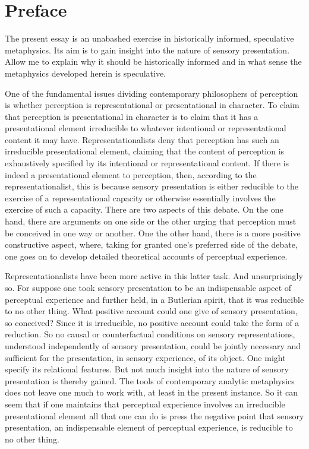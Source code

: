 \chapter*{Preface} %
\label{cha:preface}

The present essay is an unabashed exercise in historically informed, speculative metaphysics. Its aim is to gain insight into the nature of sensory presentation. Allow me to explain why it should be historically informed and in what sense the metaphysics developed herein is speculative.

One of the fundamental issues dividing contemporary philosophers of perception is whether perception is representational or presentational in character. To claim that perception is presentational in character is to claim that it has a presentational element irreducible to whatever intentional or representational content it may have. Representationalists deny that perception has such an irreducible presentational element, claiming that the content of perception is exhaustively specified by its intentional or representational content. If there is indeed a presentational element to perception, then, according to the representationalist, this is because sensory presentation is either reducible to the exercise of a representational capacity or otherwise essentially involves the exercise of such a capacity. There are two aspects of this debate. On the one hand, there are arguments on one side or the other urging that perception must be conceived in one way or another. One the other hand, there is a more positive constructive aspect, where, taking for granted one's preferred side of the debate, one goes on to develop detailed theoretical accounts of perceptual experience. 

Representationalists have been more active in this latter task. And unsurprisingly so. For suppose one took sensory presentation to be an indispensable aspect of perceptual experience and further held, in a Butlerian spirit, that it was reducible to no other thing. What positive account could one give of sensory presentation, so conceived? Since it is irreducible, no positive account could take the form of a reduction. So no causal or counterfactual conditions on sensory representations, understood independently of sensory presentation, could be jointly necessary and sufficient for the presentation, in sensory experience, of its object. One might specify its relational features. But not much insight into the nature of sensory presentation is thereby gained. The tools of contemporary analytic metaphysics does not leave one much to work with, at least in the present instance. So it can seem that if one maintains that perceptual experience involves an irreducible presentational element all that one can do is press the negative point that sensory presentation, an indispensable element of perceptual experience, is reducible to no other thing.

